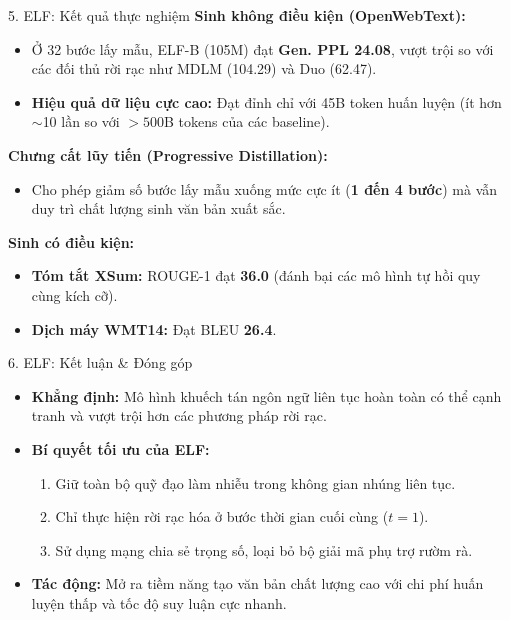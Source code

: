 \begin{frame}{5. ELF: Kết quả thực nghiệm}
    \textbf{Sinh không điều kiện (OpenWebText):}
    \begin{itemize}
        \item Ở 32 bước lấy mẫu, ELF-B (105M) đạt \textbf{Gen. PPL 24.08}, vượt trội so với các đối thủ rời rạc như MDLM (104.29) và Duo (62.47).
        \item \textbf{Hiệu quả dữ liệu cực cao:} Đạt đỉnh chỉ với 45B token huấn luyện (ít hơn $\sim$10 lần so với $>500$B tokens của các baseline).
    \end{itemize}
    \vspace{0.2cm}
    \textbf{Chưng cất lũy tiến (Progressive Distillation):}
    \begin{itemize}
        \item Cho phép giảm số bước lấy mẫu xuống mức cực ít (\textbf{1 đến 4 bước}) mà vẫn duy trì chất lượng sinh văn bản xuất sắc.
    \end{itemize}
    \vspace{0.2cm}
    \textbf{Sinh có điều kiện:}
    \begin{itemize}
        \item \textbf{Tóm tắt XSum:} ROUGE-1 đạt \textbf{36.0} (đánh bại các mô hình tự hồi quy cùng kích cỡ).
        \item \textbf{Dịch máy WMT14:} Đạt BLEU \textbf{26.4}.
    \end{itemize}
\end{frame}

\begin{frame}{6. ELF: Kết luận \& Đóng góp}
    \begin{itemize}
        \item \textbf{Khẳng định:} Mô hình khuếch tán ngôn ngữ liên tục hoàn toàn có thể cạnh tranh và vượt trội hơn các phương pháp rời rạc.
        \item \textbf{Bí quyết tối ưu của ELF:}
        \begin{enumerate}
            \item Giữ toàn bộ quỹ đạo làm nhiễu trong không gian nhúng liên tục.
            \item Chỉ thực hiện rời rạc hóa ở bước thời gian cuối cùng ($t = 1$).
            \item Sử dụng mạng chia sẻ trọng số, loại bỏ bộ giải mã phụ trợ rườm rà.
        \end{enumerate}
        \item \textbf{Tác động:} Mở ra tiềm năng tạo văn bản chất lượng cao với chi phí huấn luyện thấp và tốc độ suy luận cực nhanh.
    \end{itemize}
\end{frame}

